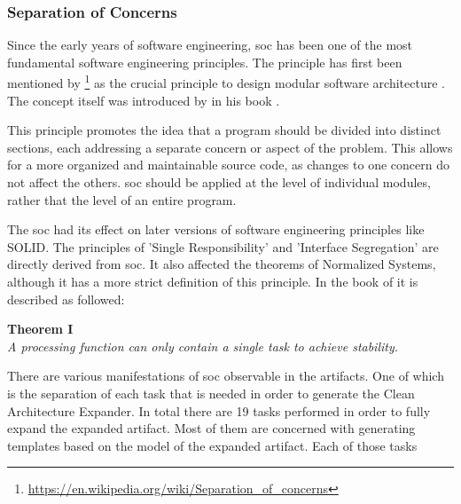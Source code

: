 \subsubsection{Separation of Concerns}
Since the early years of software engineering, \gls{soc} has been one of the most
fundamental software engineering principles. The principle has first been mentioned by
\citeauthor{dijkstra_selected_1982}\footnote{\url{https://en.wikipedia.org/wiki/Separation_of_concerns}}
as the crucial principle to design modular software architecture
\parencite[]{dijkstra_selected_1982}. The concept itself was introduced by
\citeauthor{parnas_criteria_1972} in his book .

This principle promotes the idea that a program should be divided into distinct sections,
each addressing a separate concern or aspect of the problem. This allows for a more
organized and maintainable source code, as changes to one concern do not affect the
others. \gls{soc} should be applied at the level of individual modules, rather that the level
of an entire program.

The \gls{soc} had its effect on later versions of software engineering principles like SOLID.
The principles of 'Single Responsibility' and 'Interface Segregation' are directly derived
from \gls{soc}. It also affected the theorems of Normalized Systems, although it has a more
strict definition of this principle. In the book of \citeauthor{mannaert_normalized_2016}
it is described as followed: 

\begin{center}
    \textbf{Theorem I}\\
    \textit{A processing function can only contain a single task to achieve stability.}    
\end{center}

There are various manifestations of \gls{soc} observable in the artifacts. One of which is
the separation of each task that is needed in order to generate the Clean Architecture
Expander. In total there are 19 tasks performed in order to fully expand the expanded
artifact. Most of them are concerned with generating templates based on the model of the
expanded artifact. Each of those tasks